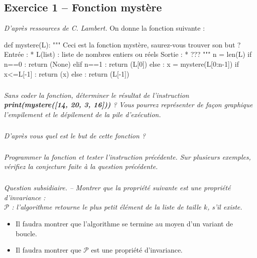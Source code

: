 \documentclass[10pt,fleqn]{article} %
\begin{document}

\vspace{10cm}
\pagestyle{fancy}
\thispagestyle{plain}


\def\columnseprulecolor{\color{ocre}}
\setlength{\columnseprule}{0.4pt} 
\begin{multicols}{2}

\subsection*{Exercice 1 -- Fonction mystère}
\textit{D'après ressources de C. Lambert.}
On donne la fonction suivante : 
\begin{py}
\begin{python}
def mystere(L):
    """
    Ceci est la fonction mystère, saurez-vous trouver 
    son but ?
    Entrée : 
        * L(list) : liste de nombres entiers ou réels
    Sortie : 
        * ??? 
    """
    n = len(L)
    if n==0 :
        return (None)
    elif n==1 :
        return (L[0])
    else :
        x = mystere(L[0:n-1])
        if x<=L[-1] :
            return (x)
        else : 
            return (L[-1])
\end{python}
\end{py}

\subparagraph{}
\textit{Sans coder la fonction, déterminer le résultat de l'instruction \textbf{print(mystere([14, 20, 3, 16]))} ? Vous pourrez représenter de façon graphique l'empilement et le dépilement de la pile d'exécution.}

\subparagraph{}
\textit{D'après vous quel est le but de cette fonction ?}

\subparagraph{}
\textit{Programmer la fonction et tester l'instruction précédente. Sur plusieurs exemples, vérifiez la conjecture faite à la question précédente.}


\subparagraph{}
\textit{Question subsidiaire. -- Montrer que la propriété suivante est une propriété d'invariance :\\
$\mathcal{P}$ : l'algorithme retourne le plus petit élément de la liste de taille $k$, s'il existe.}

\begin{rem}
\begin{itemize}
\item Il faudra montrer que l'algorithme se termine au moyen d'un variant de boucle. 
\item Il faudra montrer que $\mathcal{P}$ est une propriété d'invariance. 
\end{itemize}
\end{rem}


\end{multicols}
\end{document}
